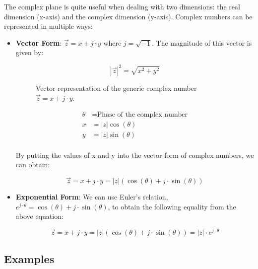 \documentclass[letterpaper,12pt]{article}
\begin{document}
The complex plane is quite useful when dealing with two dimensions: the real dimension (x-axis) and the complex dimension (y-axis). Complex numbers can be represented in multiple ways:
\begin{itemize}
    \item \textbf{Vector Form}: \(\Vec{z} = x + j\cdot y\) where $j=\sqrt{-1}$. The magnitude of this vector is given by:

          \[|\Vec{z}|^2 = \sqrt{x^2 + y^2}\]

          \begin{figure}[!ht]
              \centering
              \caption{Vector representation of the generic complex number \(\Vec{z} = x + j\cdot y\).}\label{fig:signal_vector_graph}
          \end{figure}

          \begin{align*}
              \theta & = \text{Phase of the complex number} \\
              x      & = |z|\cos(\theta)                    \\
              y      & = |z|\sin(\theta)                    \\
          \end{align*}

          By putting the values of x and y into the vector form of complex numbers, we can obtain:

          \[\Vec{z} = x + j\cdot y = |z|(\cos(\theta) + j\cdot \sin(\theta))\]

    \item \textbf{Exponential Form}: We can use Euler's relation, \(e^{j\cdot \theta} = \cos(\theta) + j\cdot \sin(\theta)\), to obtain the following equality from the above equation:

          \begin{equation}
              \label{eq:euler_complex_no}
              \Vec{z} = x + j\cdot y = |z|(\cos(\theta) + j\cdot \sin(\theta)) = |z|\cdot e^{j\cdot \theta}
          \end{equation}


\end{itemize}

\subsection*{Examples}
\end{document}
